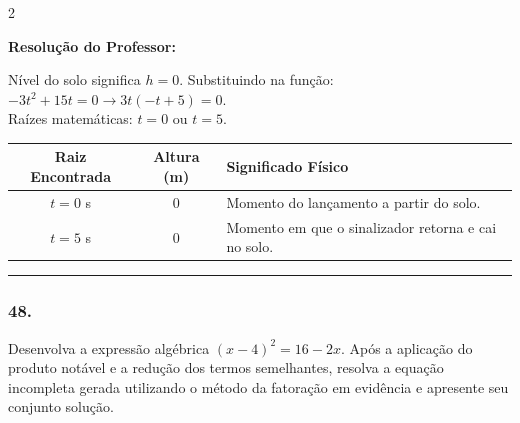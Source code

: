 \begin{multicols*}{2}
\ifgabarito
    \begin{tcolorbox}[colback=CorTitUm!5, colframe=CorTitUm, boxrule=1pt, arc=4pt, left=6pt, right=6pt, top=6pt, bottom=6pt]
    \small\textbf{\textcolor{CorTitUm}{Resolução do Professor:}}\par\vspace{0.1cm}
    \color{CinzaEscuro}
    Nível do solo significa $h = 0$. Substituindo na função:\\
    $-3t^2 + 15t = 0 \rightarrow 3t(-t + 5) = 0$.\\
    Raízes matemáticas: $t = 0$ ou $t = 5$.
    \vspace{0.1cm}
    \begin{center}
    \begin{tabular}{|c|c|l|}
    \hline
    \textbf{Raiz Encontrada} & \textbf{Altura (m)} & \textbf{Significado Físico} \\
    \hline
    $t = 0$ s & $0$ & Momento do lançamento a partir do solo. \\
    \hline
    $t = 5$ s & $0$ & Momento em que o sinalizador retorna e cai no solo. \\
    \hline
    \end{tabular}
    \end{center}
    \end{tcolorbox}
\fi

\par\vspace{\espacoQuestao}

\noindent\textcolor{CorLinha}{\rule{\linewidth}{0.5pt}} 
\par\vspace{\espacoPreQuestao}
\subsubsection*{48.} Desenvolva a expressão algébrica $ (x - 4)^2 = 16 - 2x $. Após a aplicação do produto notável e a redução dos termos semelhantes, resolva a equação incompleta gerada utilizando o método da fatoração em evidência e apresente seu conjunto solução.


\end{multicols*}
